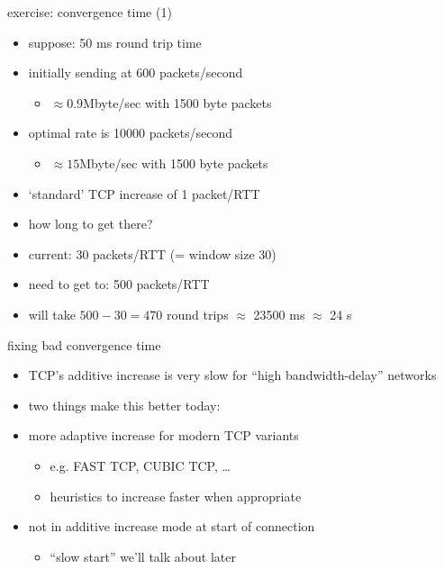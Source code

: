 \begin{frame}{exercise: convergence time (1)}
    \begin{itemize}
    \item suppose: 50 ms round trip time
    \item initially sending at 600 packets/second
        \begin{itemize}
        \item $\approx 0.9$Mbyte/sec with 1500 byte packets
        \end{itemize}
    \item optimal rate is 10000 packets/second
        \begin{itemize}
        \item $\approx 15$Mbyte/sec with 1500 byte packets
        \end{itemize}
    \item `standard' TCP increase of 1 packet/RTT
    \item how long to get there?
    \item<2-> current: 30 packets/RTT (= window size 30)
    \item<2-> need to get to: 500 packets/RTT
    \item<2-> will take $500-30=470$ round trips $\approx$ 23500 ms $\approx$ 24 s
    \end{itemize}
\end{frame}

\begin{frame}{fixing bad convergence time}
    \begin{itemize}
    \item TCP's additive increase is very slow for ``high bandwidth-delay'' networks
    \item two things make this better today:
    \vspace{.5cm}
    \item more adaptive increase for modern TCP variants
        \begin{itemize}
        \item e.g. FAST TCP, CUBIC TCP, \ldots
        \item heuristics to increase faster when appropriate
        \end{itemize}
    \item not in additive increase mode at start of connection
        \begin{itemize}
        \item ``slow start'' we'll talk about later
        \end{itemize}
    \end{itemize}
\end{frame}
